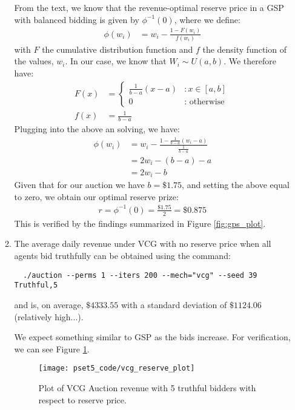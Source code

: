\documentclass[11pt]{article}
\begin{document}
\begin{enumerate}[resume]
\begin{enumerate}
  From the text, we know that the revenue-optimal reserve price in a GSP with balanced bidding is given by $\phi^{-1}(0)$, where we define:
  \begin{align*}
    \phi(w_i) &= w_i - \frac{1-F(w_i)}{f(w_i)}
  \end{align*}
  with $F$ the cumulative distribution function and $f$ the density function of the values, $w_i$. In our case, we know that $W_i \sim U(a,b)$. We therefore have:
  \begin{align*}
    F(x) &= \left\{
     \begin{array}{lr}
       \frac{1}{b-a}(x - a) & : x \in [a, b] \\
       0 & : \text{ otherwise }
     \end{array}
   \right.\\
   f(x) &= \frac{1}{b-a}  
  \end{align*}
  Plugging into the above an solving, we have:
  \begin{align*}
  \phi(w_i) &= w_i - \frac{1 - \frac{1}{b-a}(w_i - a)}{\frac{1}{b-a}} \\
  &= 2w_i - (b-a) - a \\
  &= 2w_i -b 
  \end{align*}
  Given that for our auction we have $b = \$1.75$, and setting the above equal to zero, we obtain our optimal reserve prize:
  \begin{align*}
  r = \phi^{-1}(0) = \frac{\$1.75}{2} = \$0.875
  \end{align*}
  This is verified by the findings summarized in Figure \ref{fig:gps_plot}.

  \item The average daily revenue under VCG with no reserve price when all agents bid truthfully can be obtained using the command:
  \begin{lstlisting}
  ./auction --perms 1 --iters 200 --mech="vcg" --seed 39  Truthful,5
  \end{lstlisting}
  and is, on average, $\$4333.55$ with a standard deviation of $\$1124.06$ (relatively high...).

  We expect something similar to GSP as the bids increase. For verification, we can see Figure \ref{fig:vcg_reserve}.

  \begin{figure}[h!]
    \centering
    \texttt{[image: pset5\_code/vcg\_reserve\_plot]}
    \caption{Plot of VCG Auction revenue with 5 truthful bidders with respect to reserve price.}
    \label{fig:vcg_reserve}
  \end{figure}


\end{enumerate}
\end{enumerate}
\end{document}
